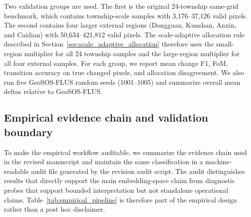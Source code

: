 \documentclass{article}
\begin{document}
Two validation groups are used. The first is the original 24-township same-grid benchmark, which contains township-scale samples with 3,176--37,126 valid pixels. The second contains four larger external regions (Dongguan, Kunshan, Anxin, and Caidian) with 50,634--421,812 valid pixels. The scale-adaptive allocation rule described in Section~\ref{sec:scale_adaptive_allocation} therefore uses the small-region multiplier for all 24 township samples and the large-region multiplier for all four external samples. For each group, we report mean change F1, FoM, transition accuracy on true changed pixels, and allocation disagreement. We also run five GeoSOS-FLUS random seeds (1001--1005) and summarize overall mean deltas relative to GeoSOS-FLUS.

\subsection{Empirical evidence chain and validation boundary}
\label{sec:evidence_chain}

To make the empirical workflow auditable, we summarize the evidence chain used in the revised manuscript and maintain the same classification in a machine-readable audit file generated by the revision audit script. The audit distinguishes results that directly support the main embedding-space claim from diagnostic probes that support bounded interpretation but not standalone operational claims. Table~\ref{tab:empirical_pipeline} is therefore part of the empirical design rather than a post hoc disclaimer.
\end{document}
